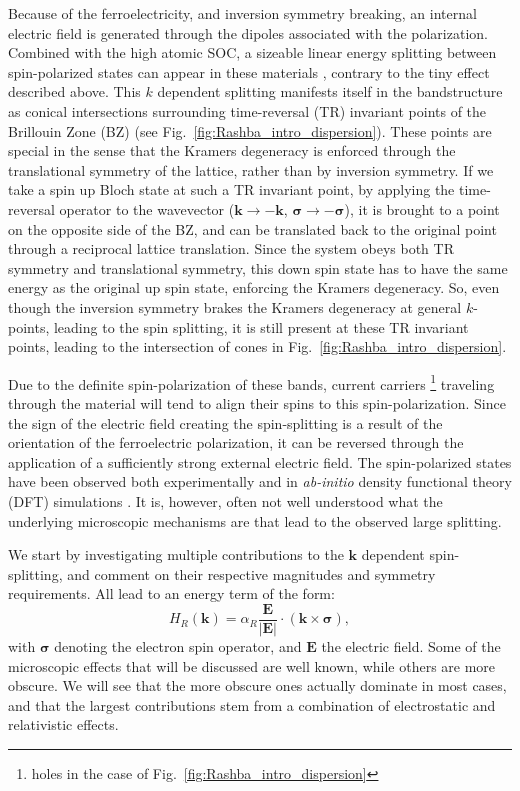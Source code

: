 Because of the ferroelectricity, and inversion symmetry breaking, an internal electric field is generated through the dipoles associated with the polarization.
Combined with the high atomic SOC, a sizeable linear energy splitting between spin-polarized states can appear in these materials \cite{DiSante2013}, contrary to the tiny effect described above.
This $k$ dependent splitting manifests itself in the bandstructure as conical intersections surrounding time-reversal (TR) invariant points of the Brillouin Zone (BZ) (see Fig.~\ref{fig:Rashba_intro_dispersion}).
These points are special in the sense that the Kramers degeneracy \cite{Kramerstheorem} is enforced through the translational symmetry of the lattice, rather than by inversion symmetry.
If we take a spin up Bloch state at such a TR invariant point, by applying the time-reversal operator to the wavevector ($\bm k \rightarrow \bm {-k}$, $\bm{\sigma} \rightarrow -\bm{\sigma}$), it is brought to a point on the opposite side of the BZ, and can be translated back to the original point through a reciprocal lattice translation.
Since the system obeys both TR symmetry and translational symmetry, this down spin state has to have the same energy as the original up spin state, enforcing the Kramers degeneracy.
So, even though the inversion symmetry brakes the Kramers degeneracy at general $k$-points, leading to the spin splitting, it is still present at these TR invariant points, leading to the intersection of cones in Fig.~\ref{fig:Rashba_intro_dispersion}.

Due to the definite spin-polarization of these bands, current carriers \footnote{holes in the case of Fig.~\ref{fig:Rashba_intro_dispersion}} traveling through the material will tend to align their spins to this spin-polarization.
Since the sign of the electric field creating the spin-splitting is a result of the orientation of the ferroelectric polarization, it can be reversed through the application of a sufficiently strong external electric field.
The spin-polarized states have been observed both experimentally \cite{Ishizaka2011,Liebmann2016,Krempasky2015} and in {\it ab-initio} density functional theory (DFT) simulations \cite{DiSante2013}.
It is, however, often not well understood what the underlying microscopic mechanisms are that lead to the observed large splitting.

We start by investigating multiple contributions to the $\bm{k}$ dependent spin-splitting, and comment on their respective magnitudes and symmetry requirements. 
All lead to an energy term of the form:
\begin{equation}
	\label{eq:Rashba_form}
	H_R(\bm{k}) = \alpha_R \frac{\bm{E}}{|\bm{E}|} \cdot (\bm{k} \times \bm{\sigma}),
\end{equation}
with $\bm{\sigma}$ denoting the electron spin operator, and $\bm{E}$ the electric field.
Some of the microscopic effects that will be discussed are well known, while others are more obscure.
We will see that the more obscure ones actually dominate in most cases, and that the largest contributions stem from a combination of electrostatic and relativistic effects.

